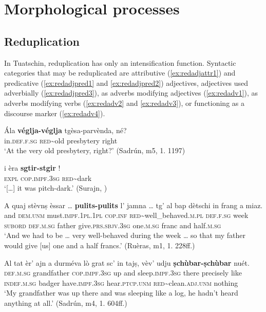 \chapter{Morphological processes}

\section{Reduplication}
In Tuatschin, reduplication has only an intensification function. Syntactic categories that may be reduplicated are attributive (\ref{ex:redadjattr1}) and predicative (\ref{ex:redadjpred1} and \ref{ex:redadjpred2})  adjectives, adjectives used adverbially (\ref{ex:redadjpred3}), as adverbs modifying adjectives (\ref{ex:redadv1}), as adverbs modifying verbs (\ref{ex:redadv2} and \ref{ex:redadv3}), or functioning as a discourse marker (\ref{ex:redadv4}).

\ea\label{ex:redadjattr1}
\gll  Ála \textbf{véglja-véglja} tgèsa-parvènda, né?\\
in.\textsc{def.f.sg} \textsc{red}\textasciitilde{old} presbytery right\\
\glt `At the very old presbytery, right?' (Sadrún, m5, 1. 1197)
\z

\ea
\label{ex:redadjpred1}
\gll  […] i èra \textbf{sgtir-stgir} !\\
{}  \textsc{expl} \textsc{cop.impf.3sg} \textsc{red}\textasciitilde{dark}\\
\glt `[…] it was pitch-dark.' (Surajn, \citealt[128]{Büchli1966})
\z

\ea
\label{ex:redadjpred2}
\gll    A quaj stèvnṣ èssar … \textbf{pulits-pulits} l’ jamna … tg’ al bap dètschi in frang a miaz.\\
and \textsc{dem.unm} must.\textsc{impf.1pl.1pl} \textsc{cop.inf} {} \textsc{red}\textasciitilde{well\_behaved}.\textsc{m.pl} \textsc{def.f.sg} week {} \textsc{subord} \textsc{def.m.sg} father  give.\textsc{prs.sbjv.3sg} one.\textsc{m.sg} franc and half.\textsc{m.sg}\\
\glt `And we had to be … very well-behaved during the week … so that my father would give [us] one and a half francs.' (Ruèras, m1, 1. 228ff.)
\z

\ea
\label{ex:redadjpred3}
\gll  Al tat èr’ ajn a durméva lò grat sc’ in tajṣ, vèv’ udju \textbf{ṣchùbar-ṣchùbar} nuét.  \\
\textsc{def.m.sg} grandfather \textsc{cop.impf.3sg} up and sleep.\textsc{impf.3sg} there precisely like \textsc{indef.m.sg} badger have.\textsc{impf.3sg} hear.\textsc{ptcp.unm} \textsc{red}\textasciitilde{clean}.\textsc{adj.unm} nothing\\
\glt `My grandfather was up there and was sleeping like a log, he hadn’t heard anything at all.' (Sadrún, m4, 1. 604ff.)
\z

